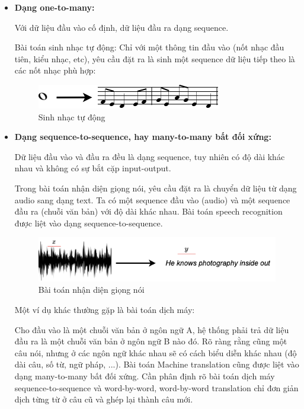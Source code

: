 \begin{itemize}
    \item \textbf{Dạng one-to-many:}

    Với dữ liệu đầu vào cố định, dữ liệu đầu ra dạng sequence.

    Bài toán sinh nhạc tự động: Chỉ với một thông tin đầu vào (nốt nhạc đầu tiên, kiểu nhạc, etc), yêu cầu đặt ra là sinh một sequence dữ liệu tiếp theo là các nốt nhạc phù hợp:

    \begin{figure}[H]
        \centering
        \includegraphics[width=\textwidth,height=\textheight,keepaspectratio]{books/artificial-neural-network/chapter06/figure-sec1/musicgeneration.png}
        \caption{Sinh nhạc tự động}
    \end{figure}

    \item \textbf{Dạng sequence-to-sequence, hay many-to-many bất đối xứng:}

    Dữ liệu đầu vào và đầu ra đều là dạng sequence, tuy nhiên có độ dài khác nhau và không có sự bắt cặp input-output.

    Trong bài toán nhận diện giọng nói, yêu cầu đặt ra là chuyển dữ liệu từ dạng audio sang dạng text. Ta có một sequence đầu vào (audio) và một sequence đầu ra (chuỗi văn bản) với độ dài khác nhau. Bài toán speech recognition được liệt vào dạng sequence-to-sequence.

    \begin{figure}[H]
        \centering
        \includegraphics[width=\textwidth,height=\textheight,keepaspectratio]{books/artificial-neural-network/chapter06/figure-sec1/soundwave.png}
        \caption{Bài toán nhận diện giọng nói}
    \end{figure}

    Một ví dụ khác thường gặp là bài toán dịch máy:

    Cho đầu vào là một chuỗi văn bản ở ngôn ngữ A, hệ thống phải trả dữ liệu đầu ra là một chuỗi văn bản ở ngôn ngữ B nào đó. Rõ ràng rằng cũng một câu nói, nhưng ở các ngôn ngữ khác nhau sẽ có cách biểu diễn khác nhau (độ dài câu, số từ, ngữ pháp, ...). Bài toán Machine translation cũng được liệt vào dạng many-to-many bất đối xứng. Cần phân định rõ bài toán dịch máy sequence-to-sequence và word-by-word, word-by-word translation chỉ đơn giản dịch từng từ ở câu cũ và ghép lại thành câu mới.


\end{itemize}

